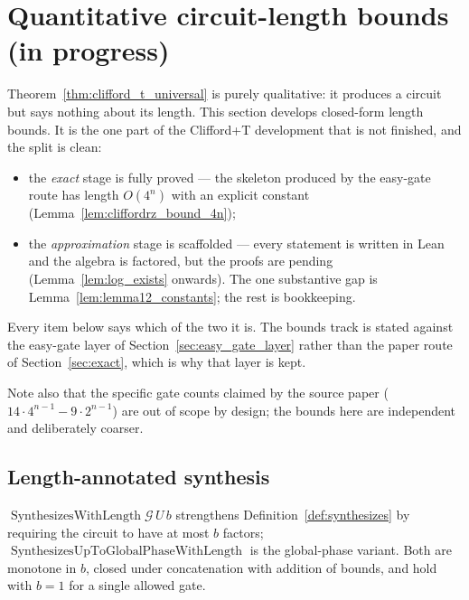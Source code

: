 \section{Quantitative circuit-length bounds (in progress)}
\label{sec:bounds}

Theorem~\ref{thm:clifford_t_universal} is purely qualitative: it produces a
circuit but says nothing about its length.  This section develops closed-form
length bounds.  It is the one part of the Clifford+T development that is not
finished, and the split is clean:

\begin{itemize}
  \item the \emph{exact} stage is fully proved --- the skeleton produced by the
    easy-gate route has length $O(4^n)$ with an explicit constant
    (Lemma~\ref{lem:cliffordrz_bound_4n});
  \item the \emph{approximation} stage is scaffolded --- every statement is
    written in Lean and the algebra is factored, but the proofs are pending
    (Lemma~\ref{lem:log_exists} onwards).  The one substantive gap is
    Lemma~\ref{lem:lemma12_constants}; the rest is bookkeeping.
\end{itemize}

Every item below says which of the two it is.  The bounds track is stated
against the easy-gate layer of Section~\ref{sec:easy_gate_layer} rather than
the paper route of Section~\ref{sec:exact}, which is why that layer is kept.

Note also that the specific gate counts claimed by the source paper
($14\cdot 4^{n-1} - 9\cdot 2^{n-1}$) are out of scope by design; the bounds
here are independent and deliberately coarser.

\subsection{Length-annotated synthesis}

\begin{definition}
  \label{def:synth_len}
  \leanok
  $\operatorname{SynthesizesWithLength} \mathcal{G}\, U\, b$ strengthens
  Definition~\ref{def:synthesizes} by requiring the circuit to have at most $b$
  factors; $\operatorname{SynthesizesUpToGlobalPhaseWithLength}$ is the
  global-phase variant.  Both are monotone in $b$, closed under concatenation
  with addition of bounds, and hold with $b = 1$ for a single allowed gate.
\end{definition}

